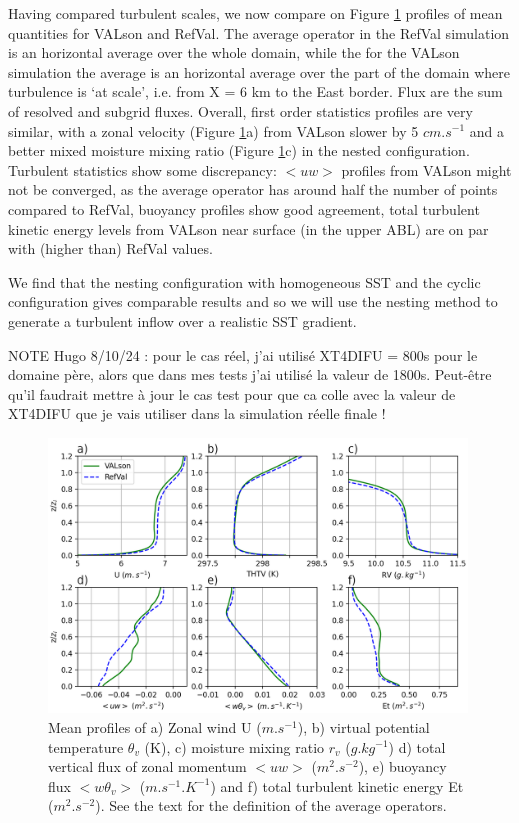 \documentclass[draft]{agujournal2019} %
\begin{document}
            Having compared turbulent scales, we now compare on Figure \ref{VAL_homo_profiles} profiles of mean quantities for VALson and RefVal. The average operator in the RefVal simulation is an horizontal average over the whole domain, while the for the VALson simulation the average is an horizontal average over the part of the domain where turbulence is `at scale', i.e. from X = 6 km to the East border. Flux are the sum of resolved and subgrid fluxes. Overall, first order statistics profiles are very similar, with a zonal velocity (Figure \ref{VAL_homo_profiles}a) from VALson slower by 5 $cm.s^{-1}$ and a better mixed moisture mixing ratio (Figure \ref{VAL_homo_profiles}c) in the nested configuration. Turbulent statistics show some discrepancy: $<uw>$ profiles from VALson might not be converged, as the average operator has around half the number of points compared to RefVal, buoyancy profiles show good agreement, total turbulent kinetic energy levels from VALson near surface (in the upper ABL) are on par with (higher than) RefVal values. 
            
            We find that the nesting configuration with homogeneous SST and the cyclic configuration gives comparable results and so we will use the nesting method to generate a turbulent inflow over a realistic SST gradient.

            NOTE Hugo 8/10/24 : pour le cas réel, j'ai utilisé XT4DIFU = 800s pour le domaine père, alors que dans mes tests j'ai utilisé la valeur de 1800s. Peut-être qu'il faudrait mettre à jour le cas test pour que ca colle avec la valeur de XT4DIFU que je vais utiliser dans la simulation réelle finale ! 

            \begin{figure}[h!]
				\centering
				\includegraphics[width=0.99\textwidth]{Verif_combined_nestVShomo_c.png}
				\caption{Mean profiles of a) Zonal wind U ($m.s^{-1}$), b) virtual potential temperature $\theta_v$ (K), c) moisture mixing ratio $r_v$ ($g.kg^{-1}$) d) total vertical flux of zonal momentum $<$$uw$$>$ ($m^2.s^{-2}$), e) buoyancy flux $<$$w\theta_v$$>$ ($m.s^{-1}.K^{-1}$) and f) total turbulent kinetic energy Et ($m^2.s^{-2}$). See the text for the definition of the average operators.}
				\label{VAL_homo_profiles}
			\end{figure} 
\end{document}
